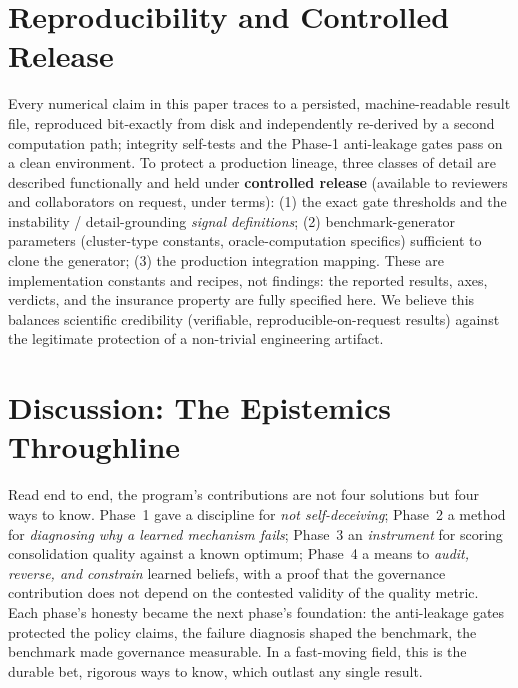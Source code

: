 \documentclass[11pt]{article}
\begin{document}
\section{Reproducibility and Controlled Release}
\label{sec:repro}
Every numerical claim in this paper traces to a persisted, machine-readable result
file, reproduced bit-exactly from disk and independently re-derived by a second
computation path; integrity self-tests and the Phase-1 anti-leakage gates pass on a
clean environment. To protect a production lineage, three classes of detail are
described functionally and held under \textbf{controlled release} (available to
reviewers and collaborators on request, under terms): (1) the exact gate thresholds
and the instability / detail-grounding \emph{signal definitions}; (2)
benchmark-generator parameters (cluster-type constants, oracle-computation specifics)
sufficient to clone the generator; (3) the production integration mapping. These are
implementation constants and recipes, not findings: the reported results, axes,
verdicts, and the insurance property are fully specified here. We believe this
balances scientific credibility (verifiable, reproducible-on-request results) against
the legitimate protection of a non-trivial engineering artifact.

\section{Discussion: The Epistemics Throughline}
Read end to end, the program's contributions are not four solutions but four ways to
know. Phase~1 gave a discipline for \emph{not self-deceiving}; Phase~2 a method for
\emph{diagnosing why a learned mechanism fails}; Phase~3 an \emph{instrument} for
scoring consolidation quality against a known optimum; Phase~4 a means to
\emph{audit, reverse, and constrain} learned beliefs, with a proof that the governance
contribution does not depend on the contested validity of the quality metric. Each
phase's honesty became the next phase's foundation: the anti-leakage gates protected
the policy claims, the failure diagnosis shaped the benchmark, the benchmark made
governance measurable. In a fast-moving field, this is the durable bet, rigorous ways
to know, which outlast any single result.
\end{document}
